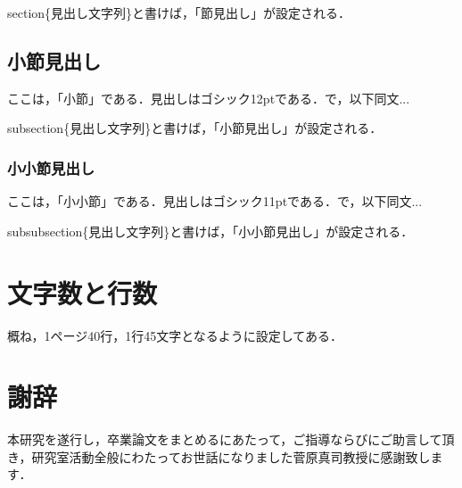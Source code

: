 \documentclass[11pt]{icsthesis}
\begin{document}
\textsf{\yen section\{見出し文字列\}}と書けば，「節見出し」が設定される．

\subsection{小節見出し}
ここは，「小節」である．見出しはゴシック12ptである．で，以下同文...

\textsf{\yen subsection\{見出し文字列\}}と書けば，「小節見出し」が設定される．

\subsubsection{小小節見出し}
ここは，「小小節」である．見出しはゴシック11ptである．で，以下同文...

\textsf{\yen subsubsection\{見出し文字列\}}と書けば，「小小節見出し」が設定される．

\section{文字数と行数}
概ね，1ページ40行，1行45文字となるように設定してある．



\clearpage
\fancyhead[L]{}\fancyhead[R]{}
\renewcommand{\headrulewidth}{0truemm}
\section*{謝辞}
本研究を遂行し，卒業論文をまとめるにあたって，ご指導ならびにご助言して頂き，研究室活動全般にわたってお世話になりました菅原真司教授に感謝致します．

\clearpage

\fancyhead[L]{\nouppercase{\small\leftmark}}\fancyhead[R]{}
\renewcommand{\headrulewidth}{0.3truemm}


\clearpage
\fancyhead[L]{\nouppercase{\small\leftmark}}
\fancyhead[R]{\nouppercase{\small\rightmark}}
\fancyfoot[C]{--\ \thepage\ --}
\renewcommand{\headrulewidth}{0.3truemm}
\appendix
\end{document}
